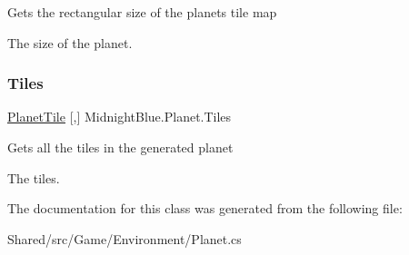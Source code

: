 Gets the rectangular size of the planets tile map 

The size of the planet.\hypertarget{class_midnight_blue_1_1_planet_a3e78bf28456cdfd2576b68e3ef106fc7}{}\label{class_midnight_blue_1_1_planet_a3e78bf28456cdfd2576b68e3ef106fc7} 
\subsubsection{\texorpdfstring{Tiles}{Tiles}}
{\footnotesize\ttfamily \hyperlink{class_midnight_blue_1_1_planet_tile}{Planet\+Tile} \mbox{[},\mbox{]} Midnight\+Blue.\+Planet.\+Tiles\hspace{0.3cm}{\ttfamily [get]}}



Gets all the tiles in the generated planet 

The tiles.

The documentation for this class was generated from the following file\+:\begin{DoxyCompactItemize}
\item 
Shared/src/\+Game/\+Environment/Planet.\+cs\end{DoxyCompactItemize}
